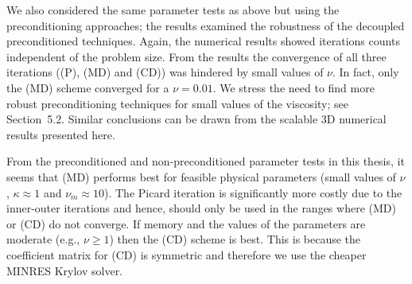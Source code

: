 We also considered the same parameter tests as above but using the preconditioning approaches; the results examined the robustness of the decoupled preconditioned techniques. Again, the numerical results showed iterations counts independent of the problem size. From the results the convergence of all three iterations ((P), (MD) and (CD)) was hindered by small values of $\nu$. In fact, only the (MD) scheme converged for a $\nu = 0.01$. We stress the need to find more robust preconditioning techniques for small values of the viscosity; see Section~5.2. Similar conclusions can be drawn from the scalable 3D numerical results presented here.

From the preconditioned and non-preconditioned parameter tests in this thesis, it seems that (MD) performs best for feasible physical parameters (small values of $\nu$, $\kappa \approx 1$ and $\nu_m \approx10$). The Picard iteration is significantly more costly due to the inner-outer iterations and hence, should only be used in the ranges where (MD) or (CD) do not converge. If memory and the values of the parameters are moderate (e.g.,  $\nu\geq 1$) then the (CD) scheme is best. This is because the coefficient matrix for (CD) is symmetric and therefore we use the cheaper MINRES Krylov solver.





